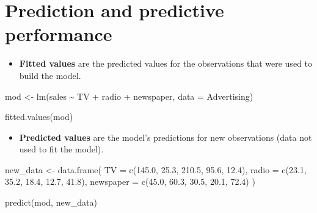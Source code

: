 \documentclass[
  letterpaper,
  DIV=11,
  numbers=noendperiod]{scrreprt}
\newenvironment{Shaded}{\begin{snugshade}}{\end{snugshade}}
\newcommand{\AttributeTok}[1]{\textcolor[rgb]{0.40,0.45,0.13}{#1}}
\newcommand{\FloatTok}[1]{\textcolor[rgb]{0.68,0.00,0.00}{#1}}
\newcommand{\FunctionTok}[1]{\textcolor[rgb]{0.28,0.35,0.67}{#1}}
\newcommand{\NormalTok}[1]{\textcolor[rgb]{0.00,0.23,0.31}{#1}}
\newcommand{\OtherTok}[1]{\textcolor[rgb]{0.00,0.23,0.31}{#1}}
\newcommand{\SpecialCharTok}[1]{\textcolor[rgb]{0.37,0.37,0.37}{#1}}
\providecommand{\tightlist}{%
  \setlength{\itemsep}{0pt}\setlength{\parskip}{0pt}}\usepackage{longtable,booktabs,array}
\begin{document}
\section{Prediction and predictive
performance}\label{prediction-and-predictive-performance}

\begin{itemize}
\tightlist
\item
  \textbf{Fitted values} are the predicted values for the observations
  that were used to build the model.
\end{itemize}

\begin{Shaded}
\begin{Highlighting}[]
\NormalTok{mod }\OtherTok{\textless{}{-}} \FunctionTok{lm}\NormalTok{(sales }\SpecialCharTok{\textasciitilde{}}\NormalTok{ TV }\SpecialCharTok{+}\NormalTok{ radio }\SpecialCharTok{+}\NormalTok{ newspaper, }\AttributeTok{data =}\NormalTok{ Advertising)}

\FunctionTok{fitted.values}\NormalTok{(mod)}
\end{Highlighting}
\end{Shaded}

\begin{itemize}
\tightlist
\item
  \textbf{Predicted values} are the model's predictions for new
  observations (data not used to fit the model).
\end{itemize}

\begin{Shaded}
\begin{Highlighting}[]
\NormalTok{new\_data }\OtherTok{\textless{}{-}} \FunctionTok{data.frame}\NormalTok{(}
  \AttributeTok{TV =} \FunctionTok{c}\NormalTok{(}\FloatTok{145.0}\NormalTok{, }\FloatTok{25.3}\NormalTok{, }\FloatTok{210.5}\NormalTok{, }\FloatTok{95.6}\NormalTok{, }\FloatTok{12.4}\NormalTok{),}
  \AttributeTok{radio =} \FunctionTok{c}\NormalTok{(}\FloatTok{23.1}\NormalTok{, }\FloatTok{35.2}\NormalTok{, }\FloatTok{18.4}\NormalTok{, }\FloatTok{12.7}\NormalTok{, }\FloatTok{41.8}\NormalTok{),}
  \AttributeTok{newspaper =} \FunctionTok{c}\NormalTok{(}\FloatTok{45.0}\NormalTok{, }\FloatTok{60.3}\NormalTok{, }\FloatTok{30.5}\NormalTok{, }\FloatTok{20.1}\NormalTok{, }\FloatTok{72.4}\NormalTok{)}
\NormalTok{)}

\FunctionTok{predict}\NormalTok{(mod, new\_data)}
\end{Highlighting}
\end{Shaded}
\end{document}
